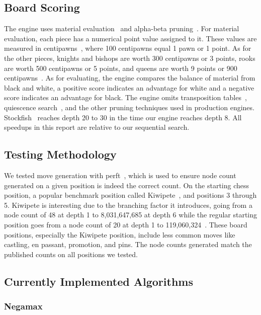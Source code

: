 \documentclass[10pt, conference, compsocconf]{IEEEtran}
\begin{document}
\subsection*{Board Scoring}

The engine uses material evaluation~\cite{shannon1950} and alpha-beta pruning~\cite{knuth1975}. For material evaluation, each piece has a numerical point value assigned to it. These values are measured in centipawns~\cite{cpwcentipawns}, where 100 centipawns equal 1 pawn or 1 point. As for the other pieces, knights and bishops are worth 300 centipawns or 3 points, rooks are worth 500 centipawns or 5 points, and queens are worth 9 points or 900 centipawns~\cite{shannon1950}. As for evaluating, the engine compares the balance of material from black and white, a positive score indicates an advantage for white and a negative score indicates an advantage for black. The engine omits transposition tables~\cite{greenblatt1967}, quiescence search~\cite{shannon1950}, and the other pruning techniques used in production engines. Stockfish~\cite{stockfish} reaches depth 20 to 30 in the time our engine reaches depth 8. All speedups in this report are relative to our sequential search.

\subsection*{Testing Methodology}

We tested move generation with perft~\cite{cpwperft}, which is used to ensure node count generated on a given position is indeed the correct count. On the starting chess position, a popular benchmark position called Kiwipete~\cite{cpwperft}, and positions 3 through 5. Kiwipete is interesting due to the branching factor it introduces, going from a node count of 48 at depth 1 to 8,031,647,685 at depth 6 while the regular starting position goes from a node count of 20 at depth 1 to 119,060,324~\cite{cpwperft}. These board positions, especially the Kiwipete position, include less common moves like castling, en passant, promotion, and pins. The node counts generated match the published counts on all positions we tested.

\subsection*{Currently Implemented Algorithms}

\subsubsection*{Negamax}
\end{document}
